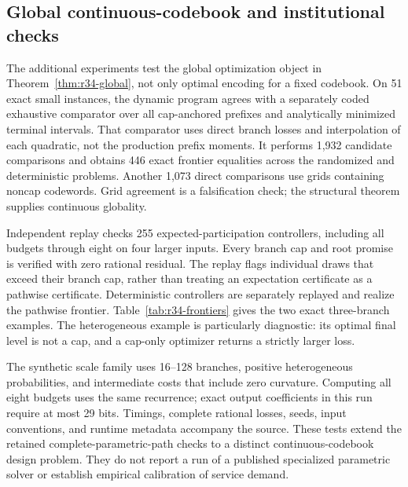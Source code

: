 \subsection{Global continuous-codebook and institutional checks}\label{sec:r34-evidence}
The additional experiments test the global optimization object in Theorem~\ref{thm:r34-global}, not only optimal encoding for a fixed codebook. On 51 exact small instances, the dynamic program agrees with a separately coded exhaustive comparator over all cap-anchored prefixes and analytically minimized terminal intervals. That comparator uses direct branch losses and interpolation of each quadratic, not the production prefix moments. It performs 1,932 candidate comparisons and obtains 446 exact frontier equalities across the randomized and deterministic problems. Another 1,073 direct comparisons use grids containing noncap codewords. Grid agreement is a falsification check; the structural theorem supplies continuous globality.

Independent replay checks 255 expected-participation controllers, including all budgets through eight on four larger inputs. Every branch cap and root promise is verified with zero rational residual. The replay flags individual draws that exceed their branch cap, rather than treating an expectation certificate as a pathwise certificate. Deterministic controllers are separately replayed and realize the pathwise frontier. Table~\ref{tab:r34-frontiers} gives the two exact three-branch examples. The heterogeneous example is particularly diagnostic: its optimal final level is not a cap, and a cap-only optimizer returns a strictly larger loss.

The synthetic scale family uses 16--128 branches, positive heterogeneous probabilities, and intermediate costs that include zero curvature. Computing all eight budgets uses the same recurrence; exact output coefficients in this run require at most 29 bits. Timings, complete rational losses, seeds, input conventions, and runtime metadata accompany the source. These tests extend the retained complete-parametric-path checks to a distinct continuous-codebook design problem. They do not report a run of a published specialized parametric solver or establish empirical calibration of service demand.
